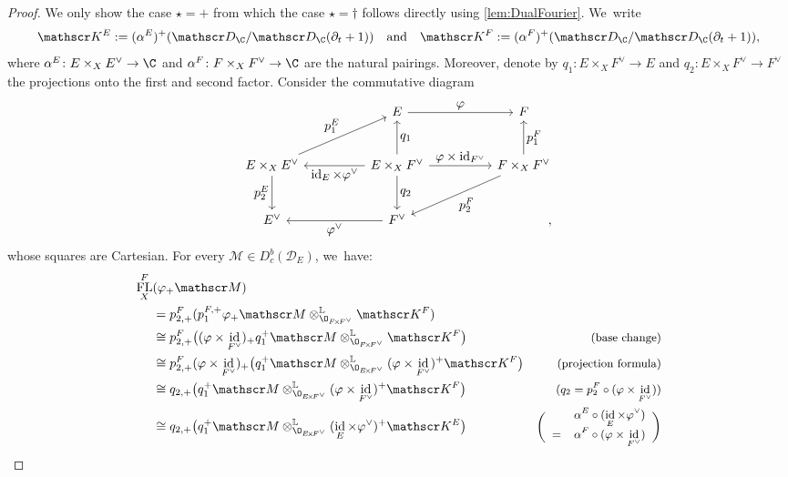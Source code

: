 \documentclass[JEP,XML,SOM,Unicode,published]{cedram}
\let\ts\textstyle
\newcommand{\quand}{\quad\text{and}\quad}
\DeclareMathOperator{\FL}{\textup{FL}}
\DeclareMathOperator{\id}{\textup{id}}
\begin{document}
\begin{proof}
We only show the case $\star=+$ from which the case $\star=\dag$ follows directly using \cref{lem:DualFourier}. We~write
\[
\mathscr K^E := (\alpha^E)^+(\mathscr D_\C/\mathscr D_\C(\partial_t+1))\quand \mathscr K^F := (\alpha^F)^+(\mathscr D_\C/\mathscr D_\C(\partial_t+1)),
\]
where $\alpha^E \colon E \times_X E^\vee \to \C$ and $\alpha^F \colon F \times_X F^\vee \to \C$ are the natural pairings. Moreover, denote by $q_1 \colon E \times_X F^\vee \to E$ and $q_2 \colon E \times_X F^\vee \to F^\vee$ the projections onto the first and second factor. Consider the commutative diagram
\[
\begin{tikzcd}[column sep=huge, row sep=large]
&
E \ar{r}{\ts \ts \varphi}
& F
\\
E \times_X E^\vee \ar{ur}{\ts p^E_1} \ar[swap]{d}{\ts \ts p^E_2}
& E \times_X F^\vee \ar{u}[swap]{\ts q_1} \ar{d}{\ts q_2} \ar{l}{\ts \id_E \times \varphi^\vee} \ar{r}{\ts \ts \varphi \times \id_{F^\vee}}
& F \times_X F^\vee \ar{dl}{\ts p_2^F} \ar[swap]{u}{\ts p_1^F}
\\
E^\vee
& F^\vee \ar{l}{\ts \varphi^\vee}
& \phantom{F \times_X F^\vee},
\end{tikzcd}
\]
whose squares are Cartesian. For every $\mathscr M \in D^b_{c}(\mathscr D_E)$, we~have:\vspace*{-5pt}
\begin{align*}
\FL_X^F&(\varphi_+ \mathscr M) & \\
&= p_{2,+}^F (p_1^{F,+} \varphi_+ \mathscr M \otimes^{\mathbb L}_{\O_{F\!\times\!F^\vee}} \mathscr K^F) & \\
&\cong p_{2,+}^F \big((\varphi \times \id_{F^\vee})_+ q_1^+ \mathscr M \otimes^{\mathbb L}_{\O_{F\!\times\!F^\vee}} \mathscr K^F\big) & \text{\small (base change)}\\
&\cong p_{2,+}^F (\varphi \times \id_{F^\vee})_+ \big(q_1^+ \mathscr M \otimes^{\mathbb L}_{\O_{E\!\times\!F^\vee}} (\varphi \times \id_{F^\vee})^+ \mathscr K^F\big) & \text{\small (projection formula)}\\
&\cong q_{2,+} \big(q_1^+ \mathscr M \otimes^{\mathbb L}_{\O_{E\!\times\!F^\vee}} (\varphi \times \id_{F^\vee})^+ \mathscr K^F\big) & \text{\small ($q_2 = p_2^F \circ (\varphi \times \id_{F^\vee})$)}\\
&\cong q_{2,+} \big(q_1^+ \mathscr M \otimes^{\mathbb L}_{\O_{E\!\times\!F^\vee}} (\id_E \times \varphi^\vee)^+ \mathscr K^E\big) & \text{\small $\biggl(\begin{array}{rl}&\alpha^E \circ (\id_E \times \varphi^\vee)\\=& \alpha^F \circ (\varphi \times \id_{F^\vee})\end{array}\biggr)$}\\

\end{align*}
\end{proof}
\end{document}
